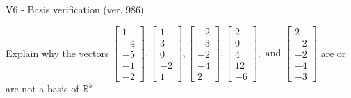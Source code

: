 \begin{exercise}
  \begin{exerciseTitle}V6 - Basis verification (ver. 986)\end{exerciseTitle}
  \begin{exerciseStatement}
    Explain why the vectors \(\left[\begin{array}{r}
1 \\
-4 \\
-5 \\
-1 \\
-2
\end{array}\right] , \left[\begin{array}{r}
1 \\
3 \\
0 \\
-2 \\
1
\end{array}\right] , \left[\begin{array}{r}
-2 \\
-3 \\
-2 \\
-4 \\
2
\end{array}\right] , \left[\begin{array}{r}
2 \\
0 \\
4 \\
12 \\
-6
\end{array}\right] , \text{ and } \left[\begin{array}{r}
2 \\
-2 \\
-2 \\
-4 \\
-3
\end{array}\right]\) are or are not a basis of \(\mathbb{R}^5\)	



\end{exerciseStatement}
\end{exercise}
